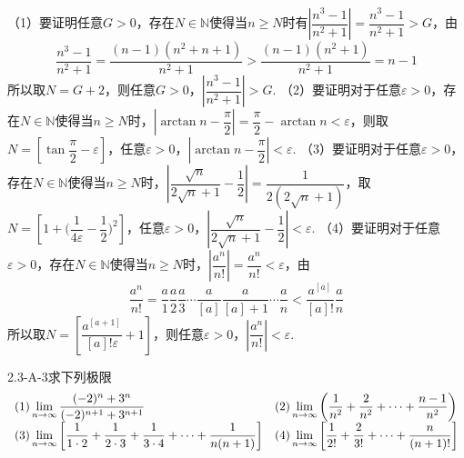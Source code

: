 \begin{solution}
    （1）要证明任意$G>0$，存在$N\in\mathbb{N}$使得当$n\geq N$时有$\left|\dfrac{n^3-1}{n^2+1}\right|=\dfrac{n^3-1}{n^2+1}>G$，由
    \[\dfrac{n^3-1}{n^2+1}=\dfrac{(n-1)(n^2+n+1)}{n^2+1}>\dfrac{(n-1)(n^2+1)}{n^2+1}=n-1\]所以取$N=G+2$，则任意$G>0$，$\left|\dfrac{n^3-1}{n^2+1}\right|>G$.\newline
    （2）要证明对于任意$\varepsilon>0$，存在$N\in\mathbb{N}$使得当$n\geq N$时，$\left|\arctan n-\dfrac{\pi}{2}\right|=\dfrac{\pi}{2}-\arctan n<\varepsilon$，则取$N=[\tan\dfrac{\pi}{2}-\varepsilon]$，任意$\varepsilon>0$，$\left|\arctan n-\dfrac{\pi}{2}\right|<\varepsilon$.\newline
    （3）要证明对于任意$\varepsilon>0$，存在$N\in\mathbb{N}$使得当$n\geq N$时，$\left|\dfrac{\sqrt{n}}{2\sqrt{n}+1}-\dfrac{1}{2}\right|=\dfrac{1}{2(2\sqrt{n}+1)}$，取$N=\left[1+\bigg(\dfrac{1}{4\varepsilon}-\dfrac12\bigg)^2\right]$，任意$\varepsilon>0$，$\left|\dfrac{\sqrt{n}}{2\sqrt{n}+1}-\dfrac{1}{2}\right|<\varepsilon$.\newline
    （4）要证明对于任意$\varepsilon>0$，存在$N\in\mathbb{N}$使得当$n\geq N$时，$\left|\dfrac{a^n}{n!}\right|=\dfrac{a^n}{n!}<\varepsilon$，由
    \[\dfrac{a^n}{n!}=\dfrac{a}{1}\dfrac{a}{2}\dfrac{a}{3}\cdots\dfrac{a}{[a]}\dfrac{a}{[a]+1}\cdots\dfrac{a}{n}<\dfrac{a^{[a]}}{[a]!}\dfrac{a}{n}\]
    所以取$N=\left[\dfrac{a^{[a+1]}}{[a]!\varepsilon}+1\right]$，则任意$\varepsilon>0$，$\left|\dfrac{a^n}{n!}\right|<\varepsilon$.    
\end{solution}
\begin{example}{2.3-A-3}{求下列极限}
\vspace{-5pt}\[\begin{array}{l@{\quad}l}
    (1)\displaystyle \lim_{n\to\infty}\dfrac{(-2)^n+3^n}{(-2)^{n+1}+3^{n+1}}&(2)\displaystyle\lim_{n\to\infty}\bigg(\dfrac{1}{n^2}+\dfrac{2}{n^2}+\cdots+\dfrac{n-1}{n^2}\bigg)\\(3)\displaystyle \lim_{n\to\infty}\left[\dfrac1{1\cdot2}+\dfrac{1}{2\cdot3}+\dfrac{1}{3\cdot4}+\cdots+\dfrac{1}{n(n+1)}\right]&(4)\displaystyle\lim_{n\to\infty}\left[\dfrac{1}{2!}+\dfrac{2}{3!}+\cdots+\dfrac{n}{(n+1)!}\right]\end{array}\]
\end{example}
